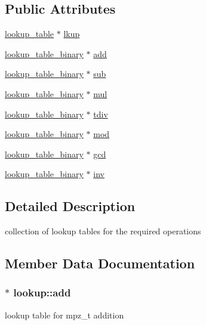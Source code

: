 \subsection*{Public Attributes}
\begin{DoxyCompactItemize}
\item 
\hyperlink{structlookup__table}{lookup\+\_\+table} $\ast$ \hyperlink{structlookup_aac4b32e67de7870ed7ef9da8077faf3d}{lkup}
\item 
\hyperlink{structlookup__table__binary}{lookup\+\_\+table\+\_\+binary} $\ast$ \hyperlink{structlookup_ada52eb4221d2d2ab592f13e57936dad2}{add}
\item 
\hyperlink{structlookup__table__binary}{lookup\+\_\+table\+\_\+binary} $\ast$ \hyperlink{structlookup_a6847e05562a081e06e25d33ac8a205a2}{sub}
\item 
\hyperlink{structlookup__table__binary}{lookup\+\_\+table\+\_\+binary} $\ast$ \hyperlink{structlookup_aab703d9a300ea104f80a39416e512041}{mul}
\item 
\hyperlink{structlookup__table__binary}{lookup\+\_\+table\+\_\+binary} $\ast$ \hyperlink{structlookup_abef492b10c81737d02dae892da38719a}{tdiv}
\item 
\hyperlink{structlookup__table__binary}{lookup\+\_\+table\+\_\+binary} $\ast$ \hyperlink{structlookup_aec682b8433afc9c027849a48f051af95}{mod}
\item 
\hyperlink{structlookup__table__binary}{lookup\+\_\+table\+\_\+binary} $\ast$ \hyperlink{structlookup_aaadaeeb9f694301aec3fe2c275c6201f}{gcd}
\item 
\hyperlink{structlookup__table__binary}{lookup\+\_\+table\+\_\+binary} $\ast$ \hyperlink{structlookup_aad2f4d538e0e689ac57e456b65f36913}{inv}
\end{DoxyCompactItemize}


\subsection{Detailed Description}
collection of lookup tables for the required operations 

\subsection{Member Data Documentation}
\subsubsection[{\texorpdfstring{add}{add}}]{$\ast$ lookup\+::add}\hypertarget{structlookup_ada52eb4221d2d2ab592f13e57936dad2}{}\label{structlookup_ada52eb4221d2d2ab592f13e57936dad2}
lookup table for mpz\+\_\+t addition 
